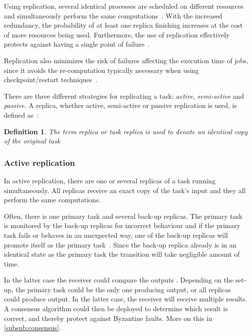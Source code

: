 \documentclass{cslthse-msc}
\newtheorem{definition}{Definition}[chapter]
\begin{document}
Using replication, several identical processes are scheduled on different resources and simultaneously perform the same computations~\cite{relGridSystems}. With the increased redundancy, the probability of at least one replica finishing increases at the cost of more resources being used. Furthermore, the use of replication effectively protects against having a single point of failure~\cite{faultToleranceGrid}.

Replication also minimizes the risk of failures affecting the execution time of jobs, since it avoids the re-computation typically necessary when using checkpoint/restart techniques~\cite{designFaultTolerantSched}.

There are three different strategies for replicating a task: \emph{active}, \emph{semi-active} and \emph{passive}. A replica, whether active, semi-active or passive replication is used, is defined as~\cite{effTaskReplMobGrid}:
\begin{definition} \label{def:replica}
The term replica or task replica is used to denote an identical copy of the original task
\end{definition}

\subsubsection{Active replication} \label{subsec:active_replication}
In active replication, there are one or several replicas of a task running simultaneously. All replicas receive an exact copy of the task's input and they all perform the same computations. 

Often, there is one primary task and several back-up replicas. The primary task is monitored by the back-up replicas for incorrect behaviour and if the primary task fails or behaves in an unexpected way, one of the back-up replicas will promote itself as the primary task~\cite{surveyFaultParallel}. Since the back-up replica already is in an identical state as the primary task the transition will take negligible amount of time. 

 In the latter case the receiver could compare the outputs .
Depending on the set-up, the primary task could be the only one producing output, or all replicas could produce output. In the latter case, the receiver will receive multiple results. A consensus algorithm could then be deployed to determine which result is correct, and thereby protect against Byzantine faults. More on this in \cref{subsub:consensus}.
\end{document}
